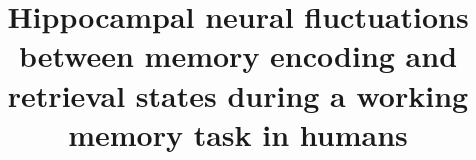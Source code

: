 \title{
Hippocampal neural fluctuations between memory encoding and retrieval states during a working memory task in humans
}